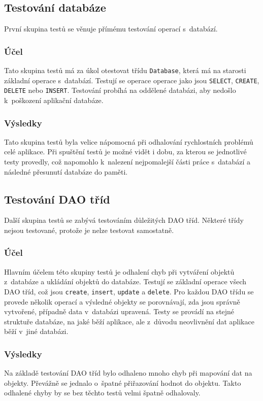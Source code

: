 \documentclass[thesis=B,czech]{resources/FITthesis}[2012/06/26]
\begin{document}
		\subsection{Testování databáze}
První skupina testů se věnuje přímému testování operací s~databází. 
			\subsubsection*{Účel}
Tato skupina testů má za úkol otestovat třídu \texttt{Database}, která má na starosti základní operace s~databází. Testují se operace operace jako jsou \texttt{SELECT}, \texttt{CREATE}, \texttt{DELETE} nebo \texttt{INSERT}. Testování probíhá na oddělené databázi, aby nedošlo k~poškození aplikační databáze. 			

			\subsubsection*{Výsledky}
Tato skupina testů byla velice nápomocná při odhalování rychlostních problémů celé aplikace. Při spuštění testů je možné vidět i dobu, za kterou se jednotlivé testy provedly, což napomohlo k~nalezení nejpomalejší části práce s~databází a následné přesunutí databáze do paměti.

		\subsection{Testování DAO tříd}
Další skupina testů se zabývá testováním důležitých DAO tříd. Některé třídy nejsou testované, protože je nelze testovat samostatně.
			\subsubsection*{Účel}
Hlavním účelem této skupiny testů je odhalení chyb při vytváření objektů z~databáze a ukládání objektů do databáze. Testují se základní operace všech DAO tříd, což jsou \texttt{create}, \texttt{insert}, \texttt{update} a \texttt{delete}. Pro každou DAO třídu se provede několik operací a výsledné objekty se porovnávají, zda jsou správně vytvořené, případně data v~databázi upravená. Testy se provádí na stejné struktuře databáze, na jaké běží aplikace, ale z~důvodu neovlivnění dat aplikace běží v~jiné databázi.
			
			\subsubsection*{Výsledky}
Na základě testování DAO tříd bylo odhaleno mnoho chyb při mapování dat na objekty. Převážně se jednalo o~špatné přiřazování hodnot do objektu. Takto odhalené chyby by se bez těchto testů velmi špatně odhalovaly.			
\end{document}
